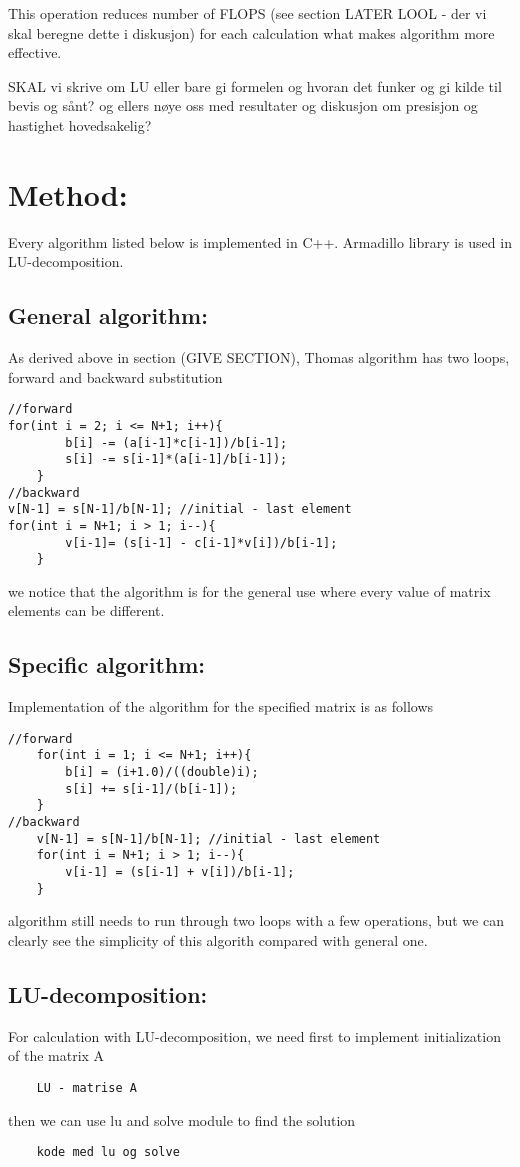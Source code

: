 \documentclass[a4paper, 10pt]{article}
\begin{document}
This operation reduces number of FLOPS (see section LATER LOOL - der vi skal
beregne dette i diskusjon) for each calculation what makes algorithm more
effective.

SKAL vi skrive om LU eller bare gi formelen og hvoran det funker og gi kilde
til bevis og sånt? og ellers nøye oss med resultater og diskusjon
om presisjon og hastighet hovedsakelig?

\section{Method:}
Every algorithm listed below is implemented in C++. Armadillo library is used
in LU-decomposition.
\subsection{General algorithm:}
As derived above in section (GIVE SECTION), Thomas algorithm has two loops,
forward and backward substitution 
\begin{lstlisting}
//forward
for(int i = 2; i <= N+1; i++){
        b[i] -= (a[i-1]*c[i-1])/b[i-1];
        s[i] -= s[i-1]*(a[i-1]/b[i-1]);
    }
//backward
v[N-1] = s[N-1]/b[N-1]; //initial - last element
for(int i = N+1; i > 1; i--){
        v[i-1]= (s[i-1] - c[i-1]*v[i])/b[i-1];
    }
\end{lstlisting}
we notice that  the algorithm is for the general use where every value of matrix
elements can be different.
\subsection{Specific algorithm:}
Implementation of the algorithm for the specified matrix is as follows
\begin{lstlisting}
//forward
    for(int i = 1; i <= N+1; i++){
        b[i] = (i+1.0)/((double)i);
        s[i] += s[i-1]/(b[i-1]);
    }
//backward
    v[N-1] = s[N-1]/b[N-1]; //initial - last element
    for(int i = N+1; i > 1; i--){
        v[i-1] = (s[i-1] + v[i])/b[i-1];
    }
\end{lstlisting}
algorithm still needs to run through two loops with a few operations, but we
can clearly see the simplicity of this algorith compared with general one.
\subsection{LU-decomposition:}
For calculation with LU-decomposition, we need first to implement
initialization of the matrix A
\begin{lstlisting}
	LU - matrise A
\end{lstlisting}
then we can use lu and solve module to find the solution
\begin{lstlisting}
	kode med lu og solve
\end{lstlisting}
\end{document}
